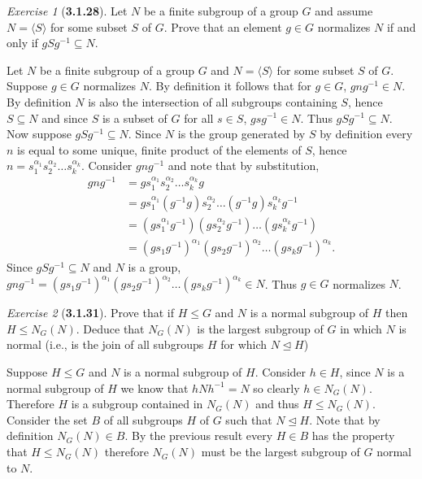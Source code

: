 \documentclass[12pt]{amsart}
\makeatletter
\theoremstyle{remark}
\newtheorem*{exercise}{Exercise}%
\renewenvironment{proof}[1][\proofname]{\par\doublespacing
  \pushQED{\qed}%
  \normalfont \topsep6\p@\@plus6\p@\relax
  \list{}{%
    \settowidth{\leftmargin}{\itshape\proofname:\hskip\labelsep}%
    \setlength{\labelwidth}{0pt}%
    \setlength{\itemindent}{-\leftmargin}%
  }%
  \item[\hskip\labelsep\itshape#1\@addpunct{:}]\ignorespaces
}{%
  \popQED\endlist\@endpefalse
  \singlespacing
}
\theoremstyle{mycomment}
\makeatother
\begin{document}
\begin{exercise}[\textbf{3.1.28}] Let $N$ be a finite subgroup of a group $G$ and assume $N = \langle S\rangle $ for some subset $S$ of $G$. 
  Prove that an element $g \in G$ normalizes $N$ if and only if $gSg^{-1} \subseteq N$.
  \begin{proof} Let $N$ be a finite subgroup of a group $G$ and $N = \langle S\rangle $ for some subset $S$ of $G$. Suppose $g \in G$ normalizes $N$. By definition
    it follows that for $g \in G$, $gng^{-1} \in N$. By definition $N$ is also the intersection of all subgroups containing $S$, hence $S \subseteq N$
    and since $S$ is a subset of $G$ for all $s \in S$, $gsg^{-1} \in N$. Thus $gSg^{-1} \subseteq N$. \\

    Now suppose $gSg^{-1} \subseteq N$. Since $N$ is the group generated by $S$ by definition every $n$ is equal to some unique, finite product of the 
    elements of $S$, hence $n = s_1^{\alpha_1}s_2^{\alpha_2}\dots s_k^{\alpha_k}$. Consider $gng^{-1}$ and note that by substitution, 
    \begin{align*}
      gng^{-1} &= gs_1^{\alpha_1}s_2^{\alpha_2}\dots s_k^{\alpha_k}g \\
      &= gs_1^{\alpha_1}(g^{-1}g)s_2^{\alpha_2}\dots (g^{-1}g)s_k^{\alpha_k}g^{-1}\\ 
      &= (gs_1^{\alpha_1}g^{-1})(gs_2^{\alpha_2}g^{-1})\dots (gs_k^{\alpha_k}g^{-1})\\ 
      &= (gs_1g^{-1})^{\alpha_1}(gs_2g^{-1})^{\alpha_2}\dots (gs_kg^{-1})^{\alpha_k}.
    \end{align*}
    Since $gSg^{-1} \subseteq N$ and $N$ is a group, $gng^{-1} = (gs_1g^{-1})^{\alpha_1}(gs_2g^{-1})^{\alpha_2}\dots (gs_kg^{-1})^{\alpha_k} \in N$. Thus $g \in G$ normalizes $N$.
    \end{proof}
\end{exercise}
\vspace{.15in}


\begin{exercise}[\textbf{3.1.31}] Prove that if $H \leq G$ and $N$ is a normal subgroup of $H$ then $H \leq N_G(N)$. Deduce that $N_G(N)$ is the largest subgroup of $G$ in which $N$ is normal (i.e., is the join of all 
  subgroups $H$ for which $N \trianglelefteq H$)
  \begin{proof} Suppose $H \leq G$ and $N$ is a normal subgroup of $H$. Consider $h \in H$, since $N$ is 
    a normal subgroup of $H$ we know that $hNh^{-1} = N$ so clearly $h \in N_G(N)$. Therefore $H$ is a subgroup contained in $N_G(N)$ and thus $H \leq N_G(N)$.\\
    
    Consider the set $B$ of all subgroups $H$ of $G$ such that $N \trianglelefteq H$. Note that by definition $N_G(N) \in B$. By the previous result every $H \in B$ has the property that $H \leq N_G(N)$ therefore $N_G(N)$ must be the largest subgroup of $G$ normal to $N$. 
  \end{proof}
\end{exercise}
\vspace{.15in}
\end{document}
